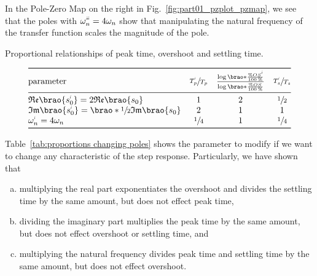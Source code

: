 \documentclass[12pt]{article}
\DeclarePairedDelimiter\brao()%
\newcommand{\setprime}[2][1]{%
    {#2}^{%
        \raisebox{1pt}{%
            \scalebox{0.5}{%
                \itshape\sffamily\uppercase%
                \expandafter{%
                    \romannumeral#1%
                }%
            }%
        }
    }%
}%
\begin{document}
In the Pole-Zero Map on the right in Fig.~\ref{fig:part01_pzplot_pzmap}, we see that the poles with $\setprime[3]\omega_n = 4\omega_n$ show that manipulating the natural frequency of the transfer function scales the magnitude of the pole.

\begin{table}[]
    \centering
    \caption{Proportional relationships of peak time, overshoot and settling time.}
    \[
        \begin{array}{@{}l*3c@{}}
        \toprule
            \text{parameter}
                & \sfrac{\setprime{T}_p}{T_p}
                & \frac{\log\brao*{\frac{\%\setprime{OS}}{\SI{100}\percent}}}{\log{\brao*{\frac{\%OS^{\vphantom1}}{\SI{100}\percent}}}}
                & \sfrac{\setprime{T}_s}{T_s}
        \\*
        \midrule
            \mathfrak{Re}\brao{\setprime{s}_0} = 2\mathfrak{Re}\brao{s_0}
            & 1
            & 2
            & \sfrac12
        \\*
            \mathfrak{Im}\brao{\setprime{s}_0} = \brao*{\sfrac12}\mathfrak{Im}\brao{s_0}
            & 2
            & 1
            & 1
        \\*
            \setprime\omega_n = 4\omega_n
            & \sfrac14
            & 1
            & \sfrac14
        \\*
        \bottomrule
        \end{array}
    \]
    \label{tab:proportions changing poles}
\end{table}

Table~\ref{tab:proportions changing poles} shows the parameter to modify if we want to change any characteristic of the step response. Particularly, we have shown that
\begin{enumerate}[(a)]
    \addtocounter{enumi}1
    \item
        multiplying the real part exponentiates the overshoot and divides the settling time by the same amount, but does not effect peak time,
    \item
        dividing the imaginary part multiplies the peak time by the same amount, but does not effect overshoot or settling time, and
    \item
        multiplying the natural frequency divides peak time and settling time by the same amount, but does not effect overshoot.
\end{enumerate}
\end{document}

